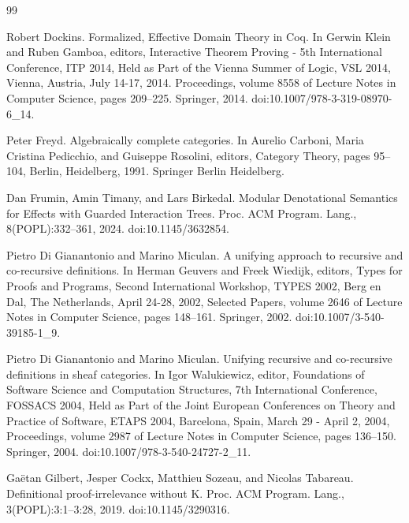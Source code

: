 \begin{thebibliography}{99}
\par\noindent    Robert Dockins.  Formalized, Effective Domain Theory in Coq.  In Gerwin Klein and Ruben Gamboa, editors, Interactive Theorem Proving - 5th International Conference, ITP 2014, Held as Part of the Vienna Summer of Logic, VSL 2014, Vienna, Austria, July 14-17, 2014. Proceedings, volume 8558 of Lecture Notes in Computer Science, pages 209–225. Springer, 2014.  doi:10.1007/978-3-319-08970-6\_14.  

\par\noindent    Peter Freyd.  Algebraically complete categories.  In Aurelio Carboni, Maria Cristina Pedicchio, and Guiseppe Rosolini, editors, Category Theory, pages 95–104, Berlin, Heidelberg, 1991. Springer Berlin Heidelberg.  

\par\noindent    Dan Frumin, Amin Timany, and Lars Birkedal.  Modular Denotational Semantics for Effects with Guarded Interaction Trees.  Proc. ACM Program. Lang., 8(POPL):332–361, 2024.  doi:10.1145/3632854.  

\par\noindent    Pietro Di Gianantonio and Marino Miculan.  A unifying approach to recursive and co-recursive definitions.  In Herman Geuvers and Freek Wiedijk, editors, Types for Proofs and Programs, Second International Workshop, TYPES 2002, Berg en Dal, The Netherlands, April 24-28, 2002, Selected Papers, volume 2646 of Lecture Notes in Computer Science, pages 148–161. Springer, 2002.  doi:10.1007/3-540-39185-1\_9.  

\par\noindent    Pietro Di Gianantonio and Marino Miculan.  Unifying recursive and co-recursive definitions in sheaf categories.  In Igor Walukiewicz, editor, Foundations of Software Science and Computation Structures, 7th International Conference, FOSSACS 2004, Held as Part of the Joint European Conferences on Theory and Practice of Software, ETAPS 2004, Barcelona, Spain, March 29 - April 2, 2004, Proceedings, volume 2987 of Lecture Notes in Computer Science, pages 136–150. Springer, 2004.  doi:10.1007/978-3-540-24727-2\_11.  

\par\noindent    Gaëtan Gilbert, Jesper Cockx, Matthieu Sozeau, and Nicolas Tabareau.  Definitional proof-irrelevance without K.  Proc. ACM Program. Lang., 3(POPL):3:1–3:28, 2019.  doi:10.1145/3290316.  


\end{thebibliography}
